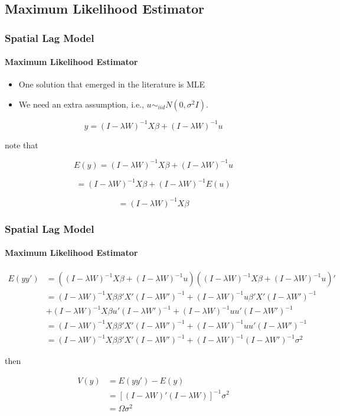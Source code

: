 \documentclass[
  shownotes,
  xcolor={svgnames},
  hyperref={colorlinks,citecolor=DarkBlue,linkcolor=DarkRed,urlcolor=DarkBlue}
  ]{beamer}
\begin{document}
\subsection{Maximum Likelihood Estimator}
\begin{frame}[fragile]
\frametitle{Spatial Lag Model}
\framesubtitle{Maximum Likelihood Estimator}
\begin{itemize}
\item One solution that emerged in the literature is MLE
\item We need an extra assumption, i.e.,  $u\sim_{iid}N(0,\sigma^{2}I)$. 
\end{itemize}

\[
y=(I-\lambda W)^{-1}X\beta+(I-\lambda W)^{-1}u
\]

note that

\[
E(y)=(I-\lambda W)^{-1}X\beta+(I-\lambda W)^{-1}u
\]

\[
=(I-\lambda W)^{-1}X\beta+(I-\lambda W)^{-1}E(u)
\]

\[
=(I-\lambda W)^{-1}X\beta
\]


\end{frame}
\begin{frame}[fragile]
\frametitle{Spatial Lag Model}
\framesubtitle{Maximum Likelihood Estimator}



\begin{align}
E(yy') & =((I-\lambda W)^{-1}X\beta+(I-\lambda W)^{-1}u)((I-\lambda W)^{-1}X\beta+(I-\lambda W)^{-1}u)' \nonumber \\ 
& = (I-\lambda W)^{-1}X\beta\beta'X'(I-\lambda W')^{-1}+(I-\lambda W)^{-1}u\beta'X'(I-\lambda W')^{-1} \nonumber \\
&+(I-\lambda W)^{-1}X\beta u'(I-\lambda W')^{-1}+(I-\lambda W)^{-1}uu'(I-\lambda W')^{-1}  \nonumber\\
&=(I-\lambda W)^{-1}X\beta\beta'X'(I-\lambda W')^{-1}+(I-\lambda W)^{-1}uu'(I-\lambda W')^{-1}  \nonumber \\
&=(I-\lambda W)^{-1}X\beta\beta'X'(I-\lambda W')^{-1}+(I-\lambda W)^{-1}(I-\lambda W')^{-1}\sigma^{2} \nonumber 
\end{align}

then

\begin{align}
V(y)&=E(yy')-E(y) \nonumber \\ 
&=[(I-\lambda W)'(I-\lambda W)]^{-1}\sigma^{2} \nonumber \\ 
&=\Omega\sigma^{2}
\end{align}


\end{frame}
\end{document}
